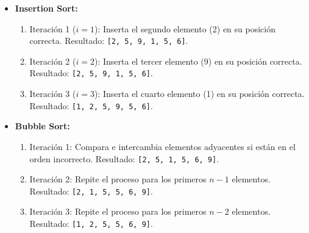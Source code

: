 \documentclass[12pt]{article}
\begin{document}
\begin{enumerate}
\begin{itemize}
                \item \textbf{Insertion Sort:}
                \begin{enumerate}
                    \item Iteración 1 (\(i=1\)): Inserta el segundo elemento (2) en su posición correcta. Resultado: \texttt{[2, 5, 9, 1, 5, 6]}.
                    \item Iteración 2 (\(i=2\)): Inserta el tercer elemento (9) en su posición correcta. Resultado: \texttt{[2, 5, 9, 1, 5, 6]}.
                    \item Iteración 3 (\(i=3\)): Inserta el cuarto elemento (1) en su posición correcta. Resultado: \texttt{[1, 2, 5, 9, 5, 6]}.
                \end{enumerate}

                \item \textbf{Bubble Sort:}
                \begin{enumerate}
                    \item Iteración 1: Compara e intercambia elementos adyacentes si están en el orden incorrecto. Resultado: \texttt{[2, 5, 1, 5, 6, 9]}.
                    \item Iteración 2: Repite el proceso para los primeros \(n-1\) elementos. Resultado: \texttt{[2, 1, 5, 5, 6, 9]}.
                    \item Iteración 3: Repite el proceso para los primeros \(n-2\) elementos. Resultado: \texttt{[1, 2, 5, 5, 6, 9]}.
                \end{enumerate}
            \end{itemize}
        \end{enumerate}
\end{document}
